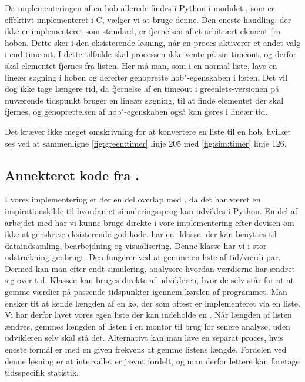 Da implementeringen af en hob allerede findes i Python i modulet , som er effektivt implementeret i C, vælger vi at bruge denne. Den eneste handling,
der ikke er implementeret som standard, er fjernelsen af et arbitrært element fra hoben. Dette sker i den eksisterende løsning, når en proces
aktiverer et andet valg i  end timeout. I dette tilfælde skal
processen ikke vente på sin timeout, og derfor skal elementet fjernes fra  listen. Her må man, som i
en normal liste, lave en lineær søgning i hoben og derefter genoprette
hob"-egenskaben i listen. Det vil dog ikke tage længere tid, da fjernelse af en timeout i greenlets-versionen på nuværende
tidspunkt bruger en lineær søgning, til at finde elementet der skal
fjernes, og genoprettelsen af hob"-egenskaben også kan gøres i lineær tid.

Det kræver ikke meget omskrivning for at konvertere en liste til en hob, hvilket ses ved at sammenligne \cref{fig:green:timer} linje 205 med \cref{fig:sim:timer} linje 126. 

\subsection{Annekteret kode fra \simpy.}
I vores implementering er der en del overlap med \simpy, da det har været en inspirationskilde til hvordan et simuleringssprog kan udvikles i Python. En del af arbejdet med \simpy har vi kunne bruge direkte i vore implementering efter devisen om ikke at genskrive eksisterende god kode. \simpy har en -klasse, der kan benyttes til dataindsamling, bearbejdning og visualisering. Denne klasse har vi i stor udstrækning genbrugt. Den fungerer ved at gemme en liste af tid/værdi par. Dermed kan man efter endt simulering, analysere  hvordan værdierne har ændret sig over tid. Klassen  kan bruges direkte af udvikleren, hvor de selv  står for at at gemme værdier på passende tidspunkter igennem kørslen af programmet. Man ønsker tit at kende længden af en kø, der som oftest er implementeret via en liste. Vi har derfor lavet vores egen liste der kan indeholde en . Når længden af listen ændres, gemmes længden af listen i en montor til brug for senere analyse, uden udvikleren selv skal stå det. Alternativt kan man lave en separat proces, hvis eneste formål er med en given frekvens at gemme listens længde. Fordelen ved denne løsning er at intervallet er jævnt fordelt, og man derfor lettere kan foretage tidsspecifik statistik.
